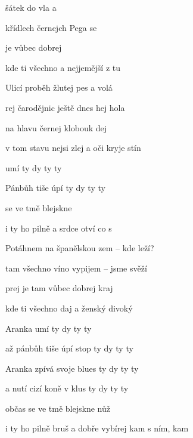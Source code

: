 

\zs
{} šátek {do} vla a 

 křídlech černejch Pega se 

 je vůbec dobrej 

kde ti všechno  a nejjemější z  tu 
\ks

\zs
Ulicí proběh žlutej pes a volá

rej čarodějnic ještě dnes hej hola

na hlavu černej klobouk dej

v tom stavu nejsi zlej a oči kryje stín
\ks

\zr
{} umí  ty dy ty ty

 Pánbůh tiše úpí  ty dy ty ty

 se ve tmě blejskne 

i ty ho pilně  a srdce otví co s 
\kr

\zs
Potáhnem na španělskou zem -- kde leží?

tam všechno víno vypijem -- jsme svěží

prej je tam vůbec dobrej kraj

kde ti všechno daj a ženský divoký
\ks

\zr
Aranka umí  ty dy ty ty

až pánbůh tiše úpí stop ty dy ty ty

Aranka zpívá svoje blues ty dy ty ty

a nutí cizí koně v klus ty dy ty ty

občas se ve tmě blejskne nůž

i ty ho pilně bruš a dobře vybírej kam s ním,  kam 
\kr

\kp





